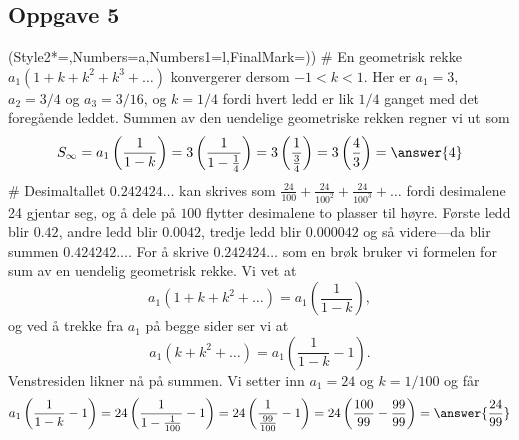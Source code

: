 \subsection*{Oppgave 5}
\begin{easylist}[enumerate]
	\ListProperties(Style2*=,Numbers=a,Numbers1=l,FinalMark={)})
	# En geometrisk rekke $a_1(1 + k + k^2 + k^3 + \dots)$ konvergerer dersom $-1 < k < 1$.
	Her er $a_1 = 3$, $a_2 = 3/4$ og $a_3 = 3/16$, og $k = 1/4$ fordi hvert ledd er lik $1/4$ ganget med det foregående leddet.
	Summen av den uendelige geometriske rekken regner vi ut som
	\begin{equation*}
		S_{\infty} = a_1 \left(\frac{1}{1 - k}\right) 
		= 3 \left(\frac{1}{1 - \frac{1}{4}}\right) 
		= 3 \left(\frac{1}{\frac{3}{4}}\right)
		=  3 \left(\frac{4}{3}\right)
		=  \answer{4}
	\end{equation*}
	# Desimaltallet $0.242424\dots$ kan skrives som 
	$\frac{24}{100} + \frac{24}{100^2} + \frac{24}{100^3} + \dots$
	fordi desimalene 24 gjentar seg, og å dele på $100$ flytter desimalene to plasser til høyre. 
	Første ledd blir $0.42$, andre ledd blir $0.0042$, tredje ledd blir $0.000042$ og så videre---da blir summen $0.424242\dots$.
	For å skrive $0.242424\dots$ som en brøk bruker vi formelen for sum av en uendelig geometrisk rekke. 
	Vi vet at
	\begin{equation*}
		a_1 (1 + k + k^2 + \dots) = a_1 \left(\frac{1}{1 - k}\right),
	\end{equation*}
	og ved å trekke fra $a_1$ på begge sider ser vi at
	\begin{equation*}
		a_1 (k + k^2 + \dots) = a_1 \left(\frac{1}{1 - k} - 1\right).
	\end{equation*}
	Venstresiden likner nå på summen. 
	Vi setter inn $a_1 = 24$ og $k = 1/100$ og får
	\begin{equation*}
		a_1 \left(\frac{1}{1 - k} - 1\right) =
		24 \left(\frac{1}{1 - \frac{1}{100}} - 1\right) = 
		24 \left(\frac{1}{\frac{99}{100}} - 1\right) = 
		24 \left(\frac{100}{99} - \frac{99}{99}\right) = \answer{\frac{24}{99}}
	\end{equation*}
\end{easylist}


